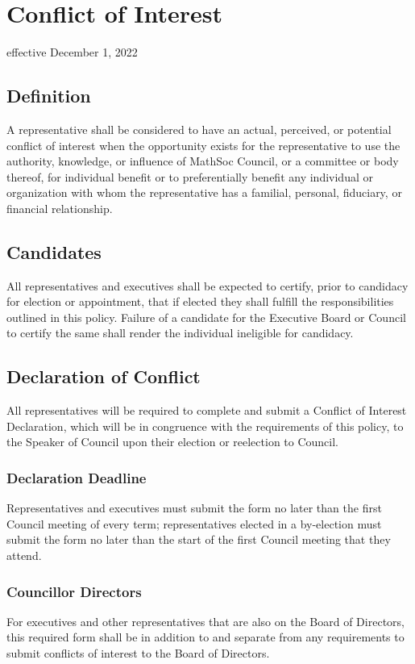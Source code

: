 \section{Conflict of Interest}
effective December 1, 2022

\subsection{Definition}
A representative shall be considered to have an actual, perceived, or potential conflict of interest when the opportunity exists for the representative to use the authority, knowledge, or influence of MathSoc Council, or a committee or body thereof, for individual benefit or to preferentially benefit any individual or organization with whom the representative has a familial, personal, fiduciary, or financial relationship.

\subsection{Candidates}
All representatives and executives shall be expected to certify, prior to candidacy for election or appointment, that if elected they shall fulfill the responsibilities outlined in this policy. Failure of a candidate for the Executive Board or Council to certify the same shall render the individual ineligible for candidacy.

\subsection{Declaration of Conflict}
All representatives will be required to complete and submit a Conflict of Interest Declaration, which will be in congruence with the requirements of this policy, to the Speaker of Council upon their election or reelection to Council. 

\subsubsection{Declaration Deadline}
Representatives and executives must submit the form no later than the first Council meeting of every term; representatives elected in a by-election must submit the form no later than the start of the first Council meeting that they attend.

\subsubsection{Councillor Directors}
For executives and other representatives that are also on the Board of Directors, this required form shall be in addition to and separate from any requirements to submit conflicts of interest to the Board of Directors.

